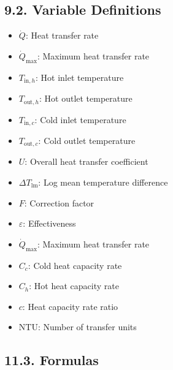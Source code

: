 \begin{multicols*}{2}
\subsection*{9.2. Variable Definitions}
\begin{itemize}
    \item $\dot{Q}$: Heat transfer rate
    \item $\dot{Q}_{\text{max}}$: Maximum heat transfer rate
    \item $T_{\text{in},h}$: Hot inlet temperature
    \item $T_{\text{out},h}$: Hot outlet temperature
    \item $T_{\text{in},c}$: Cold inlet temperature
    \item $T_{\text{out},c}$: Cold outlet temperature
    \item $U$: Overall heat transfer coefficient
    \item $\Delta T_{\text{lm}}$: Log mean temperature difference
    \item $F$: Correction factor 
    \item $\varepsilon$: Effectiveness
    \item $\dot{Q}_{\text{max}}$: Maximum heat transfer rate
    \item $C_c$: Cold heat capacity rate
    \item $C_h$: Hot heat capacity rate
    \item $c$: Heat capacity rate ratio
    \item $\text{NTU}$: Number of transfer units
\end{itemize}

\subsection*{11.3. Formulas}

\end{multicols*}
